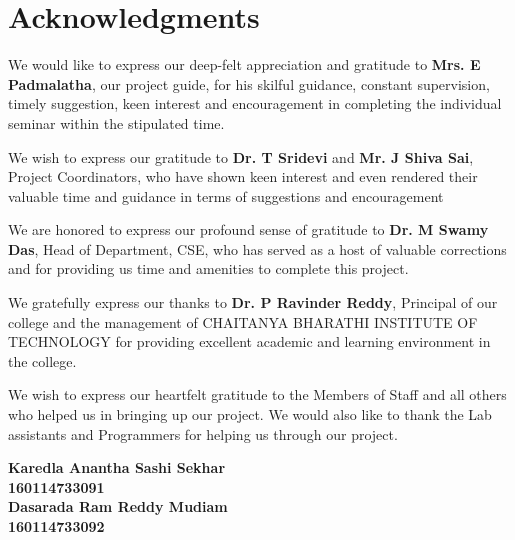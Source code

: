 \cleardoublepage
{}
{}
\chapter*{Acknowledgments}
\vspace{-0.55in}
We would like to express our deep-felt appreciation and gratitude to \textbf{Mrs. E Padmalatha}, our project guide, for his skilful guidance, constant supervision, timely suggestion, keen interest and encouragement in completing the individual seminar within the stipulated time.
\par
We wish to express our gratitude to \textbf{Dr. T Sridevi} and \textbf{Mr. J Shiva Sai}, Project Coordinators, who have shown keen interest and even rendered their valuable time and guidance in terms of suggestions and encouragement
\par
We are honored to express our profound sense of gratitude to \textbf{Dr. M Swamy Das}, Head of Department, CSE, who has served as a host of valuable corrections and for providing us time and amenities to complete this project.
\par
We gratefully express our thanks to \textbf{Dr. P Ravinder Reddy}, Principal of our college and the management of CHAITANYA BHARATHI INSTITUTE OF TECHNOLOGY for providing excellent academic and learning environment in the college.
\par
We wish to express our heartfelt gratitude to the Members of Staff and all others who helped us in bringing up our project. We would also like to thank the Lab assistants and Programmers for helping us through our project.
\\
\begin{flushright}
\textbf{Karedla Anantha Sashi Sekhar}\\\textbf{160114733091}\\\textbf{Dasarada Ram Reddy Mudiam}\\\textbf{160114733092}
\end{flushright}
\newpage

